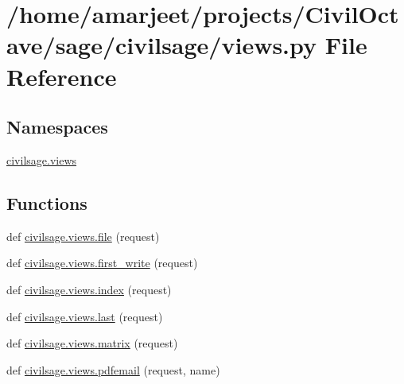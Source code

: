 \hypertarget{a00017}{}\section{/home/amarjeet/projects/\+Civil\+Octave/sage/civilsage/views.py File Reference}
\label{a00017}
\subsection*{Namespaces}
\begin{DoxyCompactItemize}
\item 
 \hyperlink{a00036}{civilsage.\+views}
\end{DoxyCompactItemize}
\subsection*{Functions}
\begin{DoxyCompactItemize}
\item 
def \hyperlink{a00036_a32de127956738677913352a2db84ecdb}{civilsage.\+views.\+file} (request)
\item 
def \hyperlink{a00036_ad9397359f36a9df37e0aa43f3be032a3}{civilsage.\+views.\+first\+\_\+write} (request)
\item 
def \hyperlink{a00036_a7b4fd4478a312ce8e35a192159c59de9}{civilsage.\+views.\+index} (request)
\item 
def \hyperlink{a00036_aed47fb0740a2fa14693f697905788719}{civilsage.\+views.\+last} (request)
\item 
def \hyperlink{a00036_a8b58c93a9c82e84143c43dafaa744a4b}{civilsage.\+views.\+matrix} (request)
\item 
def \hyperlink{a00036_a9914ff19f8e15ccab1a07eaeac8cfb21}{civilsage.\+views.\+pdfemail} (request, name)
\end{DoxyCompactItemize}
